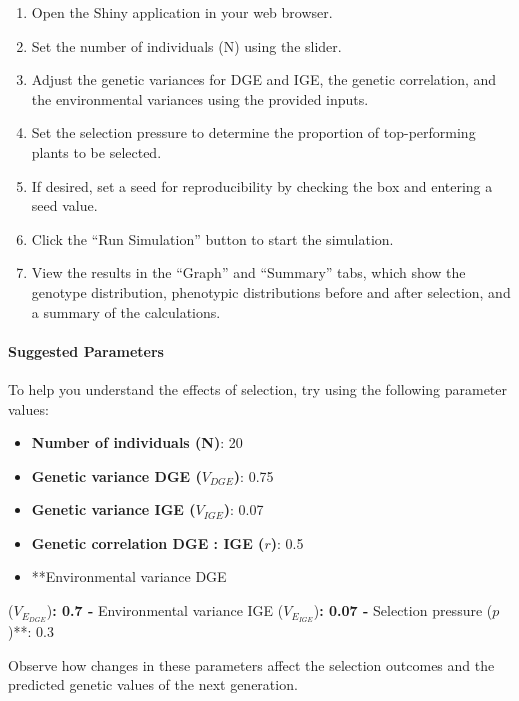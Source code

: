 \documentclass[
]{article}
\providecommand{\tightlist}{%
  \setlength{\itemsep}{0pt}\setlength{\parskip}{0pt}}
\begin{document}
\begin{enumerate}
\def\labelenumi{\arabic{enumi}.}
\tightlist
\item
  Open the Shiny application in your web browser.
\item
  Set the number of individuals (N) using the slider.
\item
  Adjust the genetic variances for DGE and IGE, the genetic correlation,
  and the environmental variances using the provided inputs.
\item
  Set the selection pressure to determine the proportion of
  top-performing plants to be selected.
\item
  If desired, set a seed for reproducibility by checking the box and
  entering a seed value.
\item
  Click the ``Run Simulation'' button to start the simulation.
\item
  View the results in the ``Graph'' and ``Summary'' tabs, which show the
  genotype distribution, phenotypic distributions before and after
  selection, and a summary of the calculations.
\end{enumerate}

\paragraph{Suggested Parameters}\label{suggested-parameters}

To help you understand the effects of selection, try using the following
parameter values:

\begin{itemize}
\tightlist
\item
  \textbf{Number of individuals (N)}: 20
\item
  \textbf{Genetic variance DGE (\(V_{DGE}\))}: 0.75
\item
  \textbf{Genetic variance IGE (\(V_{IGE}\))}: 0.07
\item
  \textbf{Genetic correlation DGE : IGE (\(r\))}: 0.5
\item
  **Environmental variance DGE
\end{itemize}

(\(V_{E_{DGE}}\))\textbf{: 0.7 - }Environmental variance IGE
(\(V_{E_{IGE}}\))\textbf{: 0.07 - }Selection pressure (\(p\))**: 0.3

Observe how changes in these parameters affect the selection outcomes
and the predicted genetic values of the next generation.
\end{document}
